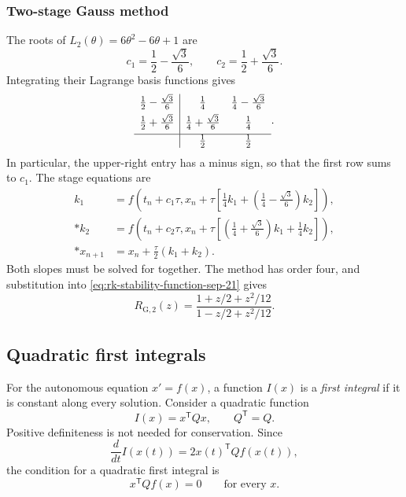 \subsubsection{Two-stage Gauss method}

The roots of \(L_2(\theta)=6\theta^2-6\theta+1\) are
\[
 c_1=\frac12-\frac{\sqrt3}{6},\qquad
 c_2=\frac12+\frac{\sqrt3}{6}.
\]
Integrating their Lagrange basis functions gives
\begin{equation}\label{eq:gauss-two-tableau-sep-23}
 \begin{array}{c|cc}
  \tfrac12-\tfrac{\sqrt3}{6}
    &\tfrac14&\tfrac14-\tfrac{\sqrt3}{6}\\[4pt]
  \tfrac12+\tfrac{\sqrt3}{6}
    &\tfrac14+\tfrac{\sqrt3}{6}&\tfrac14\\[4pt] \hline
    &\tfrac12&\tfrac12
 \end{array}.
\end{equation}
In particular, the upper-right entry has a minus sign, so that the
first row sums to \(c_1\). The stage equations are
\begin{align*}
 k_1&=f\left(t_n+c_1\tau,
       x_n+\tau\left[\frac14k_1+
                    \left(\frac14-\frac{\sqrt3}{6}\right)k_2\right]\right),\\*
 k_2&=f\left(t_n+c_2\tau,
       x_n+\tau\left[\left(\frac14+\frac{\sqrt3}{6}\right)k_1+
                    \frac14k_2\right]\right),\\*
 x_{n+1}&=x_n+\frac\tau2(k_1+k_2).
\end{align*}
Both slopes must be solved for together. The method has order four,
and substitution into \eqref{eq:rk-stability-function-sep-21} gives
\begin{equation}\label{eq:gauss-two-stability-sep-23}
 R_{\mathrm{G},2}(z)
  =\frac{1+z/2+z^2/12}{1-z/2+z^2/12}.
\end{equation}

\subsection{Quadratic first integrals}

For the autonomous equation \(x'=f(x)\), a function \(I(x)\) is a
\emph{first integral} if it is constant along every solution.
Consider a quadratic function
\[
 I(x)=x^{\mathsf T}Qx,\qquad Q^{\mathsf T}=Q.
\]
Positive definiteness is not needed for conservation. Since
\[
 \frac{d}{dt}I(x(t))=2x(t)^{\mathsf T}Qf(x(t)),
\]
the condition for a quadratic first integral is
\begin{equation}\label{eq:quadratic-invariant-condition-sep-23}
 x^{\mathsf T}Qf(x)=0\qquad\text{for every }x.
\end{equation}

